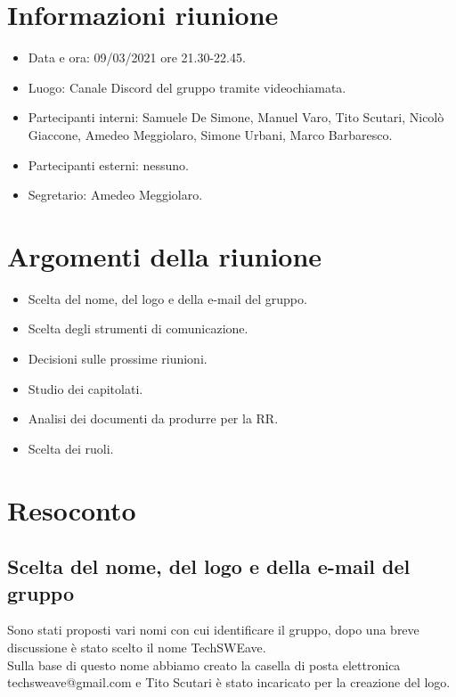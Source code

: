 \documentclass{article}
\begin{document}
    \section{Informazioni riunione}
    \begin{itemize}
        \item Data e ora: 09/03/2021 ore 21.30-22.45.
        \item Luogo: Canale Discord del gruppo tramite videochiamata.
        \item Partecipanti interni: Samuele De Simone, Manuel Varo, Tito Scutari, Nicolò Giaccone, Amedeo Meggiolaro, Simone Urbani, Marco Barbaresco.
        \item Partecipanti esterni: nessuno.
        \item Segretario: Amedeo Meggiolaro.
    \end{itemize}
    \section{Argomenti della riunione}
    \begin{itemize}
        \item Scelta del nome, del logo e della e-mail del gruppo.
        \item Scelta degli strumenti di comunicazione.
        \item Decisioni sulle prossime riunioni.
        \item Studio dei capitolati.
        \item Analisi dei documenti da produrre per la RR.
        \item Scelta dei ruoli.
    \end{itemize}
    \section{Resoconto}
    
        \subsection{Scelta del nome, del logo e della e-mail del gruppo}
        Sono stati proposti vari nomi con cui identificare il gruppo, dopo una breve
        discussione è stato scelto il nome TechSWEave.\\
        Sulla base di questo nome abbiamo creato la casella di posta elettronica 
        techsweave@gmail.com e Tito Scutari è stato incaricato per la creazione del logo.
        
\end{document}
